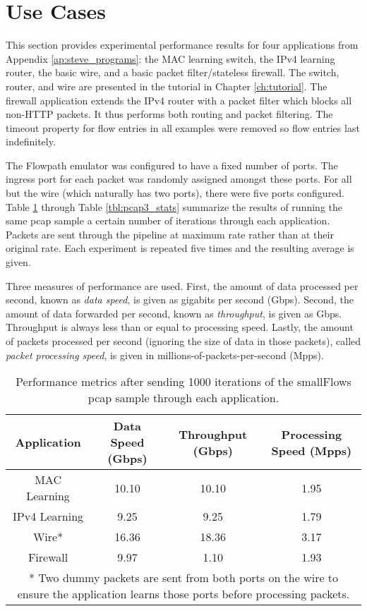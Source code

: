 \section{Use Cases}

This section provides experimental performance results for four applications from Appendix \ref{ap:steve_programs}: the MAC learning switch, the IPv4 learning router, the basic wire, and a basic packet filter/stateless firewall. The switch, router, and wire are presented in the tutorial in Chapter \ref{ch:tutorial}.
The firewall application extends the IPv4 router with a packet filter which blocks all non-HTTP packets. It thus performs both routing and packet filtering. The timeout property for flow entries in all examples were removed so flow entries last indefinitely.

The Flowpath emulator was configured to have a fixed number of ports. The ingress port for each packet was randomly assigned amongst these ports. For all but the wire (which naturally has two ports), there were five ports configured. Table \ref{tbl:pcap1_stats} through Table \ref{tbl:pcap3_stats} summarize the results of running the same pcap sample a certain number of iterations through each application. Packets are sent through the pipeline at maximum rate rather than at their original rate. Each experiment is repeated five times and the resulting average is given.

Three measures of performance are used. First, the amount of data processed per second, known as \textit{data speed}, is given as gigabits per second (Gbps). Second, the amount of data forwarded per second, known as \textit{throughput}, is given as Gbps. Throughput is always less than or equal to processing speed. Lastly, the amount of packets processed per second (ignoring the size of data in those packets), called \textit{packet processing speed}, is given in millions-of-packets-per-second (Mpps).

\begin{table}
\caption{Performance metrics after sending 1000 iterations of the smallFlows pcap sample through each application.}
\begin{center}
\begin{tabular}{| c || c | c | c | }
\hline
Application & Data Speed (Gbps) & Throughput (Gbps) & Processing Speed (Mpps)  \\
\hline
MAC Learning & 10.10 & 10.10 & 1.95  \\
\hline
IPv4 Learning & 9.25 & 9.25 & 1.79  \\
\hline 
Wire* & 16.36 & 18.36 & 3.17 \\
\hline
Firewall & 9.97 & 1.10 & 1.93 \\
\hline
\multicolumn{4}{p{\linewidth}}{* Two dummy packets are sent from both ports on the wire to ensure the application learns those ports before processing packets.}
\end{tabular}
\end{center}
\label{tbl:pcap1_stats}
\end{table}



